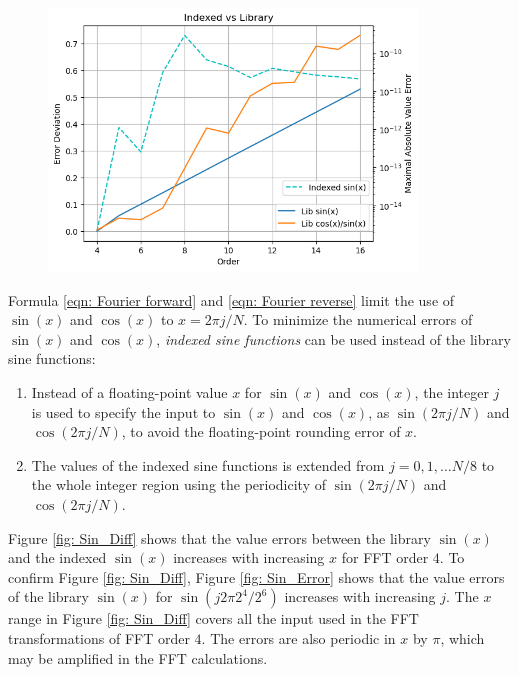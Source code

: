 \documentclass[twoside]{article}
\numberwithin{equation}{section}
\begin{document}
\begin{figure}
\includegraphics[height=2.75in]{Sin_Cot_Diff.png} 
\label{fig: Sin_Cot_Diff}
\end{figure}


Formula \eqref{eqn: Fourier forward} and \eqref{eqn: Fourier reverse} limit the use of $\sin(x)$ and $\cos(x)$ to $x = 2\pi j/N$.
To minimize the numerical errors of $\sin(x)$ and $\cos(x)$, \emph{indexed sine functions} can be used instead of the library sine functions:
\begin{enumerate}
\item Instead of a floating-point value $x$ for $\sin(x)$ and $\cos(x)$, the integer $j$ is used to specify the input to $\sin(x)$ and $\cos(x)$, as $\sin(2\pi j/N)$ and $\cos(2\pi j/N)$, to avoid the floating-point rounding error of $x$.

\item The values of the indexed sine functions is extended from $j = 0,1,\dots N/8$ to the whole integer region using the periodicity of $\sin(2\pi j/N)$ and $\cos(2\pi j/N)$.

\end{enumerate}

Figure \ref{fig: Sin_Diff} shows that the value errors between the library $\sin(x)$ and the indexed $\sin(x)$ increases with increasing $x$ for FFT order $4$.
To confirm Figure \ref{fig: Sin_Diff}, Figure \ref{fig: Sin_Error} shows that the value errors of the library $\sin(x)$ for $\sin(j 2\pi 2^4/2^6)$ increases with increasing $j$. 
The $x$ range in Figure \ref{fig: Sin_Diff} covers all the input used in the FFT transformations of FFT order $4$.
The errors are also periodic in $x$ by $\pi$, which may be amplified in the FFT calculations.
\end{document}
